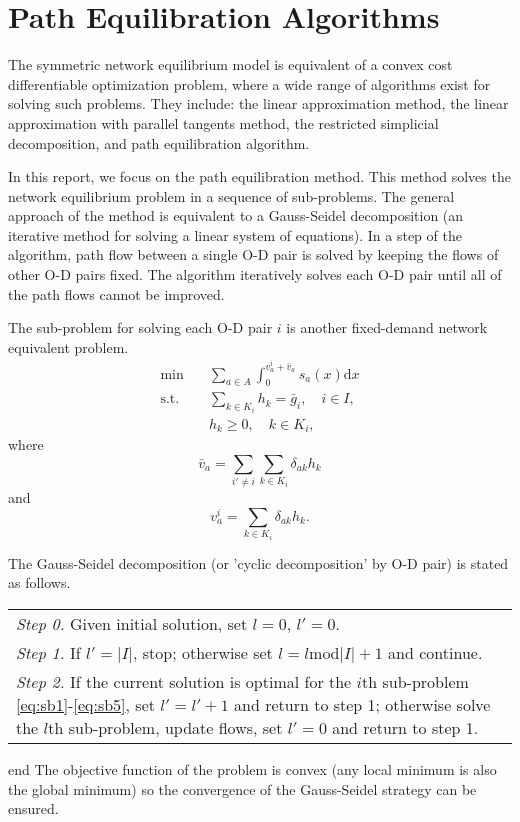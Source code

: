 \section{Path Equilibration Algorithms}
The symmetric network equilibrium model is equivalent of a convex cost differentiable optimization problem,
where a wide range of algorithms exist for solving such problems.
They include: the linear approximation method,
the linear approximation with parallel tangents method,
the restricted simplicial decomposition,
and path equilibration algorithm.

In this report, we focus on the path equilibration method.
This method solves the network equilibrium problem in a sequence of sub-problems.
The general approach of the method is equivalent to a 
Gauss-Seidel decomposition (an iterative method for solving a linear system of equations).
In a step of the algorithm,
path flow between a single O-D pair is solved by keeping the flows of other O-D pairs fixed.
The algorithm iteratively solves each O-D pair until all of the path flows cannot be improved.

The sub-problem for solving each O-D pair $i$ is another fixed-demand network equivalent problem.
\begin{align} \label{eq:sb1}
    \min & \quad \sum_{a \in A} \int_0^{v_a^i + \bar{v}_a} s_a(x) \mathrm{d} x \\
    \text{s.t.} &\quad \sum_{k \in K_i} h_k = \bar{g}_i, \quad i \in I, \\
    & \quad h_k \geq 0, \quad k \in K_i,
\end{align}
where 
\begin{equation}
    \bar{v}_a = \sum_{i' \neq i} \sum_{k \in K_i} \delta_{ak} h_k
\end{equation}
and
\begin{equation} \label{eq:sb5}
    v_a^i = \sum_{k \in K_i} \delta_{ak} h_k.
\end{equation}

The Gauss-Seidel decomposition (or 'cyclic decomposition' by O-D pair) is stated as follows.

\begin{table}[H]
    \begin{tabular}{ m{} }
        \emph{Step 0.} Given initial solution, set $l = 0$, $l' = 0$.\\
        \emph{Step 1.} If $l' = |I|$, stop; otherwise set $l = l \text{mod} |I| + 1$ and continue.\\
        \emph{Step 2.} If the current solution is optimal for the $i$th sub-problem \ref{eq:sb1}-\ref{eq:sb5}, set $l' = l' + 1$ and return to step 1; otherwise solve the $l$th sub-problem, update flows, set $l' = 0$ and return to step 1.\\
    \end{tabular}
\end{table}
end
The objective function of the problem is convex (any local minimum is also the global minimum) so the convergence of the Gauss-Seidel strategy can be ensured.

